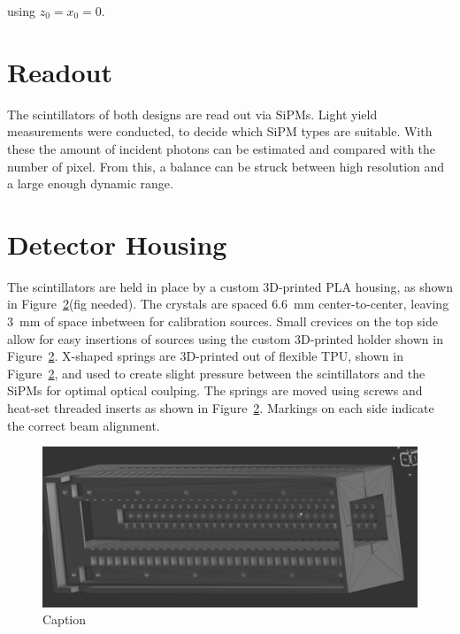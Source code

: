 using $z_0 = x_0 = 0$.

\section{Readout}\label{section:readout}
The scintillators of both designs are read out via SiPMs.
Light yield measurements were conducted, to decide which SiPM types are suitable.
With these the amount of incident photons can be estimated and compared with the number of pixel.
From this, a balance can be struck between high resolution and a large enough dynamic range.

\section{Detector Housing}
The scintillators are held in place by a custom 3D-printed PLA housing, as shown in Figure~\ref{}(fig needed).
The crystals are spaced \SI{6.6}{\milli\meter} center-to-center, leaving \SI{3}{\milli\meter} of space inbetween for calibration sources.
Small crevices on the top side allow for easy insertions of sources using the custom 3D-printed holder shown in Figure~\ref{}.
X-shaped springs are 3D-printed out of flexible TPU, shown in Figure~\ref{}, and used to create slight pressure between the scintillators and the \glspl{SiPM} for optimal optical coulping.
The springs are moved using screws and heat-set threaded inserts as shown in Figure~\ref{}.
Markings on each side indicate the correct beam alignment.

\begin{figure}[h]
    \centering
    \includegraphics[width=0.5\linewidth]{fig/pbwo4Detector/housingSTL.png}
    \caption{Caption}
    \label{fig:enter-label}
\end{figure}

